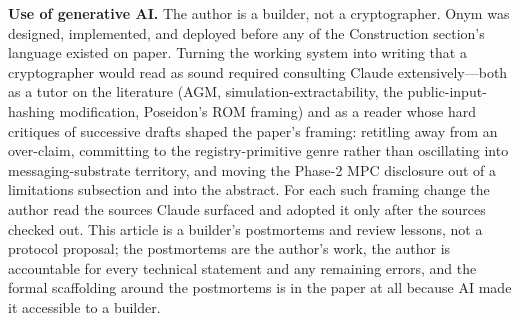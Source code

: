 \documentclass{IEEEcsmag}
\begin{document}
\textbf{Use of generative AI.} The author is a builder, not a cryptographer. Onym was designed, implemented, and deployed before any of the Construction section's language existed on paper. Turning the working system into writing that a cryptographer would read as sound required consulting Claude extensively---both as a tutor on the literature (AGM, simulation-extractability, the public-input-hashing modification, Poseidon's ROM framing) and as a reader whose hard critiques of successive drafts shaped the paper's framing: retitling away from an over-claim, committing to the registry-primitive genre rather than oscillating into messaging-substrate territory, and moving the Phase-2 MPC disclosure out of a limitations subsection and into the abstract. For each such framing change the author read the sources Claude surfaced and adopted it only after the sources checked out. This article is a builder's postmortems and review lessons, not a protocol proposal; the postmortems are the author's work, the author is accountable for every technical statement and any remaining errors, and the formal scaffolding around the postmortems is in the paper at all because AI made it accessible to a builder.


\def\refname{REFERENCES}
\end{document}
